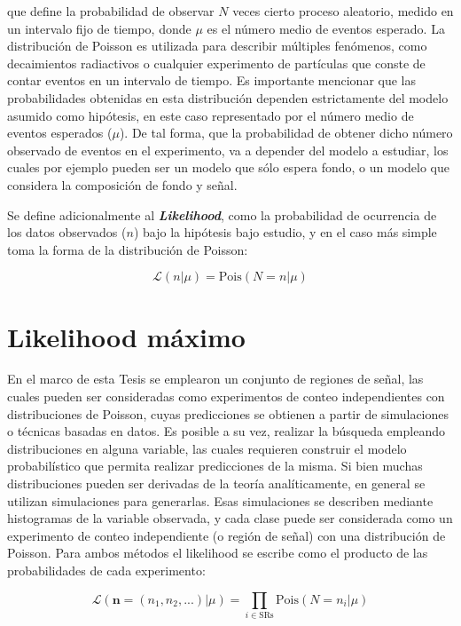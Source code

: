 \noindent
que define la probabilidad de observar $N$ veces cierto proceso aleatorio, medido en un intervalo fijo de tiempo, donde $\mu$ es el número medio de eventos esperado. La distribución de Poisson es utilizada para describir múltiples fenómenos, como decaimientos radiactivos o cualquier experimento de partículas que conste de contar eventos en un intervalo de tiempo. Es importante mencionar que las probabilidades obtenidas en esta distribución dependen estrictamente del modelo asumido como hipótesis, en este caso representado por el número medio de eventos esperados ($\mu$). De tal forma, que la probabilidad de obtener dicho número observado de eventos en el experimento, va a depender del modelo a estudiar, los cuales por ejemplo pueden ser un modelo que sólo espera fondo, o un modelo que considera la composición de fondo y señal. 

Se define adicionalmente al \textbf{\textit{Likelihood}}, como la probabilidad de ocurrencia de los datos observados ($n$) bajo la hipótesis bajo estudio, y en el caso más simple toma la forma de la distribución de Poisson:

\begin{equation}
	\mathcal{L}(n|\mu) = \text{Pois}(N=n|\mu) 
\end{equation}

\section{Likelihood máximo}

En el marco de esta Tesis se emplearon un conjunto de regiones de señal, las cuales pueden ser consideradas como experimentos de conteo independientes con distribuciones de Poisson, cuyas predicciones se obtienen a partir de simulaciones o técnicas basadas en datos. 
Es posible a su vez, realizar la búsqueda empleando distribuciones en alguna variable, las cuales requieren construir el modelo probabilístico que permita realizar predicciones de la misma. Si bien muchas distribuciones pueden ser derivadas de la teoría analíticamente, en general se utilizan simulaciones para generarlas. Esas simulaciones se describen mediante histogramas de la variable observada, y cada clase puede ser considerada como un experimento de conteo independiente (o región de señal) con una distribución de Poisson. 
Para ambos métodos el likelihood se escribe como el producto de las probabilidades de cada experimento:


\begin{equation}
	\mathcal{L}(\textbf{n}=(n_1,n_2,...)|\mu) = \prod_{i\in \text{SRs}} \text{Pois}(N=n_i|\mu) 
\end{equation}


